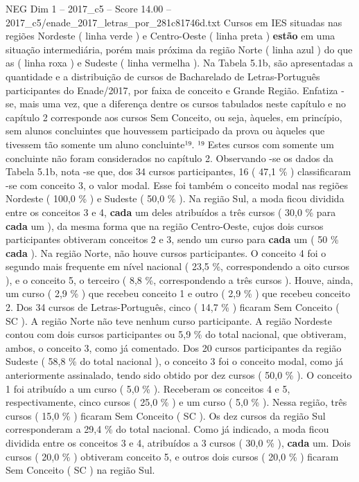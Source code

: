 \begin{textsample}{NEG Dim 1 – 2017\_c5 – Score 14.00 – 2017\_c5/enade\_2017\_letras\_por\_281c81746d.txt}
Cursos em IES situadas nas regiões Nordeste ( linha verde ) e Centro-Oeste ( linha preta ) \textbf{estão} em uma situação intermediária, porém mais próxima da região Norte ( linha azul ) do que as ( linha roxa ) e Sudeste ( linha vermelha ).
Na Tabela 5.1b, são apresentadas a quantidade e a distribuição de cursos de Bacharelado de Letras-Português participantes do Enade/2017, por faixa de conceito e Grande Região.
Enfatiza -se, mais uma vez, que a diferença dentre os cursos tabulados neste capítulo e no capítulo 2 corresponde aos cursos Sem Conceito, ou seja, àqueles, em princípio, sem alunos concluintes que houvessem participado da prova ou àqueles que tivessem tão somente um aluno concluinte¹⁹. ¹⁹ Estes cursos com somente um concluinte não foram considerados no capítulo 2.
Observando -se os dados da Tabela 5.1b, nota -se que, dos 34 cursos participantes, 16 ( 47,1 \% ) classificaram -se com conceito 3, o valor modal.
Esse foi também o conceito modal nas regiões Nordeste ( 100,0 \% ) e Sudeste ( 50,0 \% ).
Na região Sul, a moda ficou dividida entre os conceitos 3 e 4, \textbf{cada} um deles atribuídos a três cursos ( 30,0 \% para \textbf{cada} um ), da mesma forma que na região Centro-Oeste, cujos dois cursos participantes obtiveram conceitos 2 e 3, sendo um curso para \textbf{cada} um ( 50 \% \textbf{cada} ).
Na região Norte, não houve cursos participantes.
O conceito 4 foi o segundo mais frequente em nível nacional ( 23,5 \%, correspondendo a oito cursos ), e o conceito 5, o terceiro ( 8,8 \%, correspondendo a três cursos ).
Houve, ainda, um curso ( 2,9 \% ) que recebeu conceito 1 e outro ( 2,9 \% ) que recebeu conceito 2.
Dos 34 cursos de Letras-Português, cinco ( 14,7 \% ) ficaram Sem Conceito ( SC ).
A região Norte não teve nenhum curso participante.
A região Nordeste contou com dois cursos participantes ou 5,9 \% do total nacional, que obtiveram, ambos, o conceito 3, como já comentado.
Dos 20 cursos participantes da região Sudeste ( 58,8 \% do total nacional ), o conceito 3 foi o conceito modal, como já anteriormente assinalado, tendo sido obtido por dez cursos ( 50,0 \% ).
O conceito 1 foi atribuído a um curso ( 5,0 \% ).
Receberam os conceitos 4 e 5, respectivamente, cinco cursos ( 25,0 \% ) e um curso ( 5,0 \% ).
Nessa região, três cursos ( 15,0 \% ) ficaram Sem Conceito ( SC ).
Os dez cursos da região Sul corresponderam a 29,4 \% do total nacional.
Como já indicado, a moda ficou dividida entre os conceitos 3 e 4, atribuídos a 3 cursos ( 30,0 \% ), \textbf{cada} um.
Dois cursos ( 20,0 \% ) obtiveram conceito 5, e outros dois cursos ( 20,0 \% ) ficaram Sem Conceito ( SC ) na região Sul.

\end{textsample}

